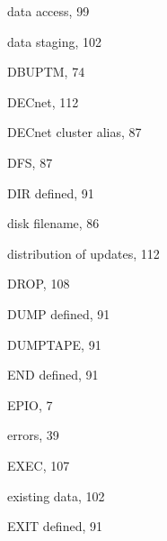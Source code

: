 \begin{theindex}
  \indexspace

  \item data access, 99
  \item data staging, 102
  \item DBUPTM, 74
  \item DECnet, 112
  \item DECnet cluster alias, 87
  \item DFS, 87
  \item DIR
    \subitem defined, 91
  \item disk filename, 86
  \item distribution of updates, 112
  \item DROP, 108
  \item DUMP
    \subitem defined, 91
  \item DUMPTAPE, 91

  \indexspace

  \item END
    \subitem defined, 91
  \item EPIO, 7
  \item errors, 39
  \item EXEC, 107
  \item existing data, 102
  \item EXIT
    \subitem defined, 91

  \indexspace


\end{theindex}
